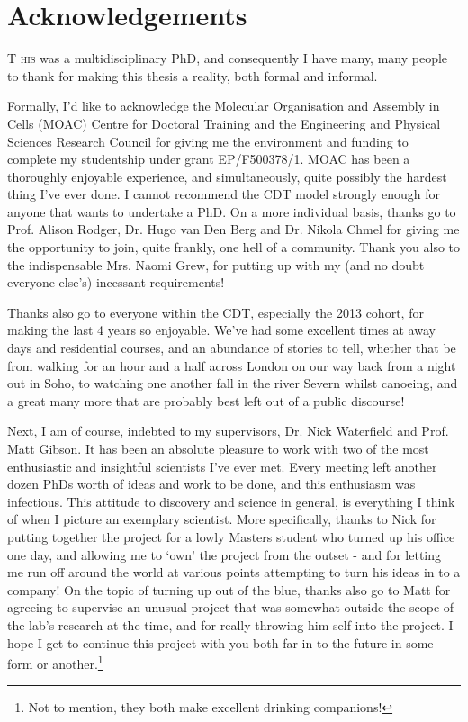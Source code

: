 \pagestyle{plain}
\chapter*{Acknowledgements}

\lettrine[lraise=0.0, nindent=0.1em, slope=1em]{T}{ his} was a multidisciplinary PhD, and consequently I have many, many people to thank for making this thesis a reality, both formal and informal.

Formally, I'd like to acknowledge the Molecular Organisation and Assembly in Cells (MOAC) Centre for Doctoral Training and the Engineering and Physical Sciences Research Council for giving me the environment and funding to complete my studentship under grant EP/F500378/1. MOAC has been a thoroughly enjoyable experience, and simultaneously, quite possibly the hardest thing I've ever done. I cannot recommend the CDT model strongly enough for anyone that wants to undertake a PhD. On a more individual basis, thanks go to Prof. Alison Rodger, Dr. Hugo van Den Berg and Dr. Nikola Chmel for giving me the opportunity to join, quite frankly, one hell of a community. Thank you also to the indispensable Mrs. Naomi Grew, for putting up with my (and no doubt everyone else's) incessant requirements!

Thanks also go to everyone within the CDT, especially the 2013 cohort, for making the last 4 years so enjoyable. We've had some excellent times at away days and residential courses, and an abundance of stories to tell, whether that be from walking for an hour and a half across London on our way back from a night out in Soho, to watching one another fall in the river Severn whilst canoeing, and a great many more that are probably best left out of a public discourse!

Next, I am of course, indebted to my supervisors, Dr. Nick Waterfield and Prof. Matt Gibson. It has been an absolute pleasure to work with two of the most enthusiastic and insightful scientists I've ever met. Every meeting left another dozen PhDs worth of ideas and work to be done, and this enthusiasm was infectious. This attitude to discovery and science in general, is everything I think of when I picture an exemplary scientist. More specifically, thanks to Nick for putting together the project for a lowly Masters student who turned up his office one day, and allowing me to `own' the project from the outset - and for letting me run off around the world at various points attempting to turn his ideas in to a company! On the topic of turning up out of the blue, thanks also go to Matt for agreeing to supervise an unusual project that was somewhat outside the scope of the lab's research at the time, and for really throwing him self into the project. I hope I get to continue this project with you both far in to the future in some form or another.\footnote{Not to mention, they both make excellent drinking companions!}

